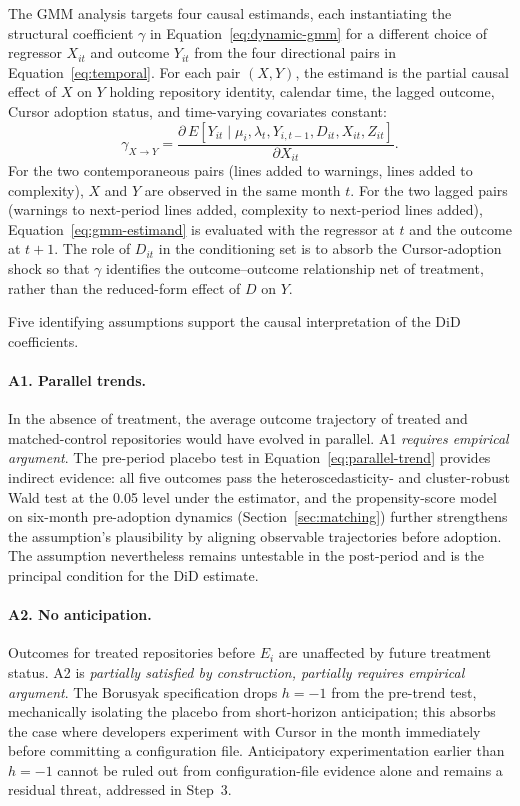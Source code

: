 The GMM analysis targets four causal estimands, each instantiating the structural coefficient $\gamma$ in Equation~\ref{eq:dynamic-gmm} for a different choice of regressor $X_{it}$ and outcome $Y_{it}$ from the four directional pairs in Equation~\ref{eq:temporal}.
For each pair $(X, Y)$, the estimand is the partial causal effect of $X$ on $Y$ holding repository identity, calendar time, the lagged outcome, Cursor adoption status, and time-varying covariates constant:
\begin{equation}
\label{eq:gmm-estimand}
    \gamma_{X \to Y} = \frac{\partial \, E[Y_{it} \mid \mu_i, \lambda_t, Y_{i,t-1}, D_{it}, X_{it}, Z_{it}]}{\partial X_{it}}.
\end{equation}
For the two contemporaneous pairs (lines added to warnings, lines added to complexity), $X$ and $Y$ are observed in the same month $t$.
For the two lagged pairs (warnings to next-period lines added, complexity to next-period lines added), Equation~\ref{eq:gmm-estimand} is evaluated with the regressor at $t$ and the outcome at $t+1$.
The role of $D_{it}$ in the conditioning set is to absorb the Cursor-adoption shock so that $\gamma$ identifies the outcome--outcome relationship net of treatment, rather than the reduced-form effect of $D$ on $Y$.

Five identifying assumptions support the causal interpretation of the DiD coefficients.

\paragraph{A1. Parallel trends.}
In the absence of treatment, the average outcome trajectory of treated and matched-control repositories would have evolved in parallel.
A1 \emph{requires empirical argument}.
The pre-period placebo test in Equation~\ref{eq:parallel-trend} provides indirect evidence: all five outcomes pass the heteroscedasticity- and cluster-robust Wald test at the 0.05 level under the \citet{borusyak2024revisiting} estimator, and the propensity-score model on six-month pre-adoption dynamics (Section~\ref{sec:matching}) further strengthens the assumption's plausibility by aligning observable trajectories before adoption.
The assumption nevertheless remains untestable in the post-period and is the principal condition for the DiD estimate.

\paragraph{A2. No anticipation.}
Outcomes for treated repositories before $E_i$ are unaffected by future treatment status.
A2 is \emph{partially satisfied by construction, partially requires empirical argument}.
The Borusyak specification drops $h=-1$ from the pre-trend test, mechanically isolating the placebo from short-horizon anticipation; this absorbs the case where developers experiment with Cursor in the month immediately before committing a configuration file.
Anticipatory experimentation earlier than $h=-1$ cannot be ruled out from configuration-file evidence alone and remains a residual threat, addressed in Step~3.

